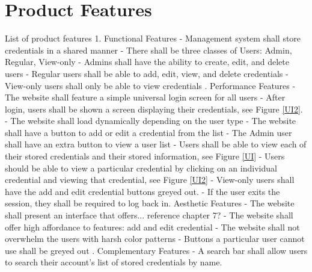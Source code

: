 \documentclass[letterpaper,12pt,oneside,listof=totoc]{scrreprt}
\begin{document}
\section{Product Features}
List of product features \newline
1. Functional Features \newline
- Management system shall store credentials in a shared manner\newline
- There shall be three classes of Users: Admin, Regular, View-only \newline
- Admins shall have the ability to create, edit, and delete users \newline
- Regular users shall be able to add, edit, view, and delete credentials \newline
- View-only users shall only be able to view credentials \newline
{}. Performance Features \newline
- The website shall feature a simple universal login screen for all users\newline
- After login, users shall be shown a screen displaying their credentials, see Figure \ref{UI2}.\newline
- The website shall load dynamically depending on the user type \newline
- The website shall have a button to add or edit a credential from the list\newline
- The Admin user shall have an extra button to view a user list\newline
- Users shall be able to view each of their stored credentials and their stored information, see Figure \ref{UI} \newline
- Users should be able to view a particular credential by clicking on an individual credential and viewing that credential, see Figure \ref{UI2}
- View-only users shall have the add and edit credential buttons greyed out. \newline
- If the user exits the session, they shall be required to log back in. Aesthetic Features \newline
- The website shall present an interface that offers... reference chapter 7? \newline
- The website shall offer high affordance to features: add and edit credential\newline
- The website shall not overwhelm the users with harsh color patterns\newline
- Buttons a particular user cannot use shall be greyed out\newline
{}. Complementary Features \newline
- A search bar shall allow users to search their account's list of stored credentials by name.
\end{document}
